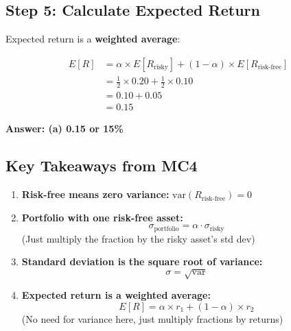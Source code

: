\documentclass[12pt]{article}
\begin{document}
\newpage

\subsection*{\large Step 5: Calculate Expected Return}

Expected return is a \textbf{weighted average}:

\begin{align*}
E[R] &= \alpha \times E[R_{\text{risky}}] + (1-\alpha) \times E[R_{\text{risk-free}}] \\
&= \frac{1}{2} \times 0.20 + \frac{1}{2} \times 0.10 \\
&= 0.10 + 0.05 \\
&= 0.15
\end{align*}

\vspace{2em}

\begin{center}
\colorbox{green!20}{
\LARGE
\textbf{Answer: (a) 0.15 or 15\%}
}
\end{center}

\vspace{2em}

\subsection*{\large Key Takeaways from MC4}

\begin{enumerate}[leftmargin=2cm, itemsep=1em]
    \item \textbf{Risk-free means zero variance:} $\text{var}(R_{\text{risk-free}}) = 0$

    \item \textbf{Portfolio with one risk-free asset:}
    \[
    \sigma_{\text{portfolio}} = \alpha \cdot \sigma_{\text{risky}}
    \]
    (Just multiply the fraction by the risky asset's std dev)

    \item \textbf{Standard deviation is the square root of variance:}
    \[
    \sigma = \sqrt{\text{var}}
    \]

    \item \textbf{Expected return is a weighted average:}
    \[
    E[R] = \alpha \times r_1 + (1-\alpha) \times r_2
    \]
    (No need for variance here, just multiply fractions by returns)
\end{enumerate}

\vspace{2em}
\end{document}
